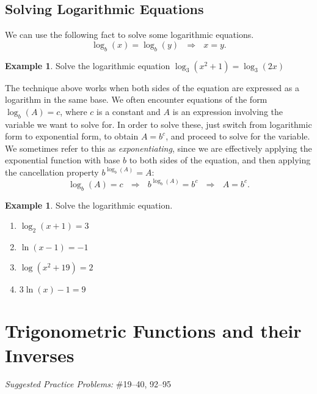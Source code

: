 \documentclass[letterpaper,12pt,oneside]{book}
\theoremstyle{definition}
\newtheorem{example}[theorem]{Example}
\newcommand{\practicesection}[2]{%
    \section{#1}
    \textit{Suggested Practice Problems:} #2
    \smallskip%
}
\begin{document}
{\newpage

\subsection*{Solving Logarithmic Equations}

We can use the following fact to solve some logarithmic equations.
\[
\log_b(x)=\log_b(y)\ \ \ \Rightarrow \ \ \ x=y.
\]


\begin{example}
Solve the logarithmic equation $\log_3(x^2+1)=\log_3(2x)$
\end{example}

\vfill

\noindent
The technique above works when both sides of the equation are expressed as a logarithm in the same base.  We often encounter equations of the form $\log_b(A)=c$, where $c$ is a constant and $A$ is an expression involving the variable we want to solve for.  In order to solve these, just switch from logarithmic form to exponential form, to obtain $A=b^c$, and proceed to solve for the variable.  We sometimes refer to this as \emph{exponentiating}, since we are effectively applying the exponential function with base $b$ to both sides of the equation, and then applying the cancellation property $b^{\log_b(A)}=A$:
\[
\log_b(A)=c \ \ \ \Longrightarrow \ \ \ b^{\log_b(A)}=b^c \ \ \ \Longrightarrow\ \ \  A=b^c.
\]

\begin{example}
Solve the logarithmic equation.
\begin{multicols}{2}
\begin{enumerate}
\item $\log_2(x+1)=3$
\vspace{4cm}
\item $\ln(x-1)=-1$
\vspace{4cm}
\item $\log(x^2+19)=2$
\vspace{4cm}
\item $3\ln(x)-1=9$
\vspace{4cm}
\vspace*{\fill}
\end{enumerate}
\end{multicols}
\end{example}


\newpage

\practicesection{Trigonometric Functions and their Inverses}{\#19--40, 92--95}

\label{Sec:TrigReview}

}
\end{document}
